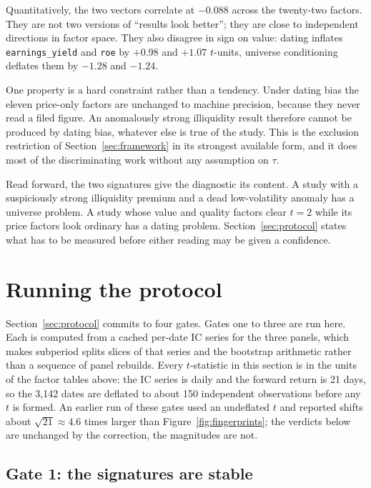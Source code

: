 \documentclass[11pt]{article}
\newcommand{\fac}[1]{\texttt{\small #1}}
\begin{document}
Quantitatively, the two vectors correlate at $-0.088$ across the twenty-two factors. They
are not two versions of ``results look better''; they are close to independent directions
in factor space. They also disagree in sign on value: dating inflates
\fac{earnings\_yield} and \fac{roe} by $+0.98$ and $+1.07$ $t$-units, universe
conditioning deflates them by $-1.28$ and $-1.24$.

One property is a hard constraint rather than a tendency. Under dating bias the eleven
price-only factors are unchanged to machine precision, because they never read a filed
figure. An anomalously strong illiquidity result therefore cannot be produced by dating
bias, whatever else is true of the study. This is the exclusion restriction of
Section~\ref{sec:framework} in its strongest available form, and it does most of the
discriminating work without any assumption on $\tau$.

Read forward, the two signatures give the diagnostic its content. A study with a
suspiciously strong illiquidity premium and a dead low-volatility anomaly has a universe
problem. A study whose value and quality factors clear $t = 2$ while its price factors
look ordinary has a dating problem. Section~\ref{sec:protocol} states what has to be
measured before either reading may be given a confidence.

\section{Running the protocol}
\label{sec:gates}

Section~\ref{sec:protocol} commits to four gates. Gates one to three are run here.
Each is computed from a cached per-date IC series for the three panels, which makes
subperiod splits slices of that series and the bootstrap arithmetic rather than a
sequence of panel rebuilds. Every $t$-statistic in this section is in the units of the
factor tables above: the IC series is daily and the forward return is 21 days, so the
3,142 dates are deflated to about 150 independent observations before any $t$ is
formed. An earlier run of these gates used an undeflated $t$ and reported shifts about
$\sqrt{21} \approx 4.6$ times larger than Figure~\ref{fig:fingerprints}; the verdicts
below are unchanged by the correction, the magnitudes are not.

\subsection{Gate 1: the signatures are stable}
\end{document}
